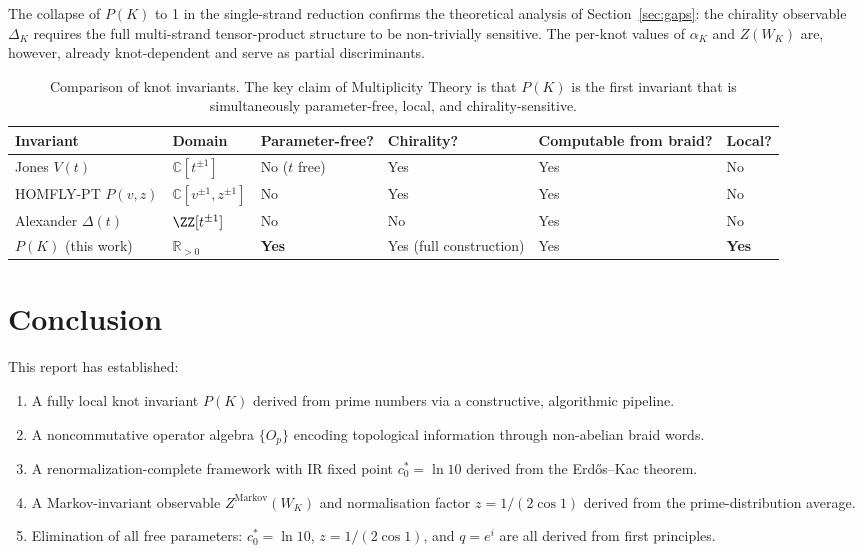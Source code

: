 \documentclass[11pt]{article}
\newcommand{\RR}{\mathbb{R}}
\newcommand{\CC}{\mathbb{C}}
\begin{document}
The collapse of $P(K)$ to 1 in the single-strand reduction confirms the theoretical analysis of Section~\ref{sec:gaps}: the chirality observable $\Delta_K$ requires the full multi-strand tensor-product structure to be non-trivially sensitive. The per-knot values of $\alpha_K$ and $Z(W_K)$ are, however, already knot-dependent and serve as partial discriminants.

\begin{table}[h!]
\centering
\begin{tabular}{@{}llllll@{}}
\toprule
Invariant & Domain & Parameter-free? & Chirality? & Computable from braid? & Local?\\
\midrule
Jones $V(t)$ & $\CC[t^{\pm1}]$ & No ($t$ free) & Yes & Yes & No\\
HOMFLY-PT $P(v,z)$ & $\CC[v^{\pm1},z^{\pm1}]$ & No & Yes & Yes & No\\
Alexander $\Delta(t)$ & $\ZZ[t^{\pm1}]$ & No & No & Yes & No\\
$P(K)$ (this work) & $\RR_{>0}$ & \textbf{Yes} & Yes (full construction) & Yes & \textbf{Yes}\\
\bottomrule
\end{tabular}
\caption{Comparison of knot invariants. The key claim of Multiplicity Theory is that $P(K)$ is the first invariant that is simultaneously parameter-free, local, and chirality-sensitive.}
\end{table}

\section{Conclusion}

This report has established:

\begin{enumerate}
  \item A fully local knot invariant $P(K)$ derived from prime numbers via a constructive, algorithmic pipeline.
  \item A noncommutative operator algebra $\{O_p\}$ encoding topological information through non-abelian braid words.
  \item A renormalization-complete framework with IR fixed point $c_0^*=\ln 10$ derived from the Erd\H{o}s--Kac theorem.
  \item A Markov-invariant observable $Z^{\text{Markov}}(W_K)$ and normalisation factor $z=1/(2\cos1)$ derived from the prime-distribution average.
  \item Elimination of all free parameters: $c_0^*=\ln10$, $z=1/(2\cos1)$, and $q=e^i$ are all derived from first principles.
\end{enumerate}
\end{document}

